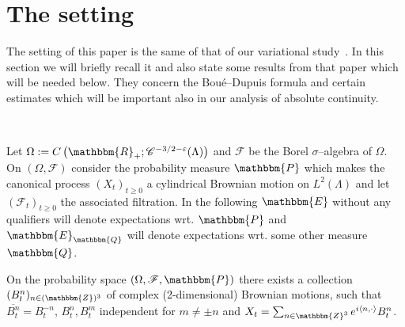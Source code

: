 \documentclass[11pt]{article}
\newcommand{\assign}{:=}
\newcommand{\VV}{\mathscr{C}}
\newcommand{\CF}{\mathscr{F}}
\begin{document}
\section{The setting}

The setting of this paper is the same of that of our variational
study~{\cite{barashkov_gubinelli_variational}}. In this section we will
briefly recall it and also state some results from that paper which will be
needed below. They concern the Bou{\'e}--Dupuis formula and certain estimates
which will be important also in our analysis of absolute continuity.

\

Let $\Omega \assign C \left( \mathbbm{R}_+ ; \VV^{- 3 / 2 - \varepsilon}
(\Lambda) \right)$ and $\CF$ be the Borel $\sigma$--algebra of $\Omega$. On
$\left( \Omega, \CF \right)$ consider the probability measure $\mathbbm{P}$
which makes the canonical process $(X_t)_{t \geqslant 0}$ a cylindrical
Brownian motion on $L^2 (\Lambda)$ and let $\left( \CF_t \right)_{t \geqslant
0}$ the associated filtration. In the following $\mathbbm{E}$ without any
qualifiers will denote expectations wrt. $\mathbbm{P}$ and
$\mathbbm{E}_{\mathbbm{Q}}$ will denote expectations wrt. some other measure
$\mathbbm{Q}$.

On the probability space $\left( \Omega, \CF, \mathbbm{P} \right)$ there
exists a collection $(B_t^n)_{n \in (\mathbbm{Z})^3}$ of complex
(2-dimensional) Brownian motions, such that $\overline{B^n_t} = B^{- n}_t$,
$B^n_t, B^m_t$ independent for $m \neq \pm n$ and $X_t = \sum_{n \in
\mathbbm{Z}^3} e^{i \langle n, \cdot \rangle} B^n_t$.

\
\end{document}
